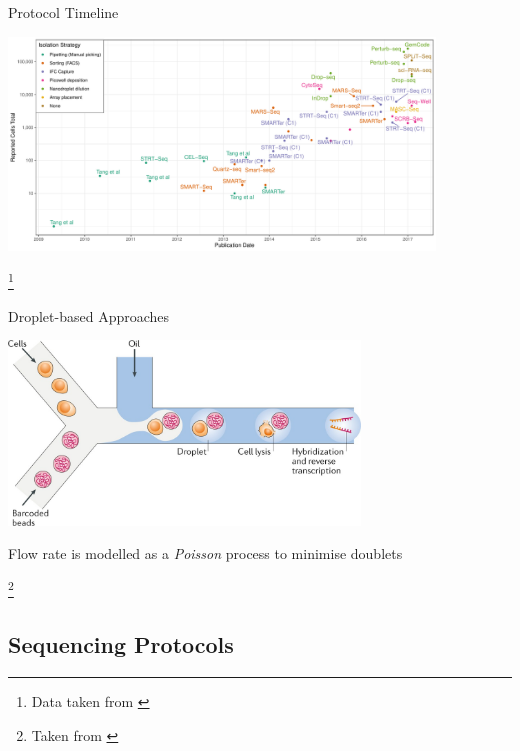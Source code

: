 \documentclass[aspectratio=169,11pt]{beamer}
\newcommand\blfootnote[1]{%
  \begingroup
  \renewcommand\thefootnote{}\footnote{#1}%
  \addtocounter{footnote}{-1}%
  \endgroup
}
\begin{document}
\begin{frame}{Protocol Timeline}

	\begin{center}
		\includegraphics[width=0.85\textwidth]{figures/scRNATimeline.pdf} 
	\end{center}

	\blfootnote{Data taken from \cite{pmid29494575}}

\end{frame}

\begin{frame}{Droplet-based Approaches}

	\begin{center}
		\includegraphics[width=0.7\textwidth]{figures/Droplet.jpg}
	\end{center}
	
	\pause
	Flow rate is modelled as a \textit{Poisson} process to minimise doublets
	
	\blfootnote{Taken from \cite{pmid29789704}}

\end{frame}

\subsection{Sequencing Protocols}
\end{document}
